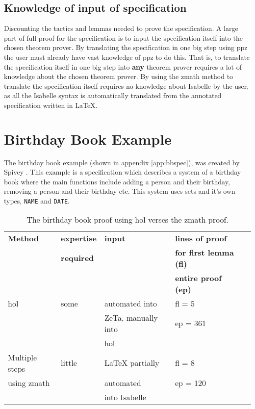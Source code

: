 \subsection{Knowledge of input of specification}
Discounting the tactics and lemmas needed to prove the specification. A large part of full proof for the specification is to input the specification itself into the chosen theorem prover. By translating the specification in one big step using \gls{ppz} the user must already have vast knowledge of \gls{ppz} to do this. That is, to translate the specification itself in one big step into \textbf{any} theorem prover requires a lot of knowledge about the chosen theorem prover. By using the \gls{zmath} method to translate the specification itself requires no knowledge about Isabelle by the user, as all the Isabelle syntax is automatically translated from the annotated specification written in \LaTeX{}. 

\section{Birthday Book Example}

The birthday book example (shown in appendix \ref{app:bbspec}), was created by Spivey \cite{spiveyreferencemanual}. This example is a specification which describes a system of a birthday book where the main functions include adding a person and their birthday, removing a person and their birthday etc. This system uses sets and it's own types, \texttt{NAME} and \texttt{DATE}.

\begin{table}[H]
\begin{center}
\begin{tabular}{| l || l | l | l | l |}
\hline
\textbf{Method} & \textbf{expertise} &  \textbf{input} & \textbf{lines of proof}  \\
& \textbf{required} & & \textbf{for first lemma (fl)}  \\
& & & \textbf{entire proof (ep)} \\
\hline
 \gls{hol} & some  & automated into  & fl = 5  \\
 & & ZeTa, manually into & ep = 361 \\
& & \gls{hol} & \\
\hline
 Multiple steps &  little & \LaTeX{} partially  & fl = 8  \\
using \gls{zmath} & & automated & ep = 120 \\
&  & into Isabelle &  \\
\hline
\end{tabular}
\end{center}
\caption{The birthday book proof using \gls{hol} verses the \gls{zmath} proof.}
\label{tab:comparebb}
\end{table}

